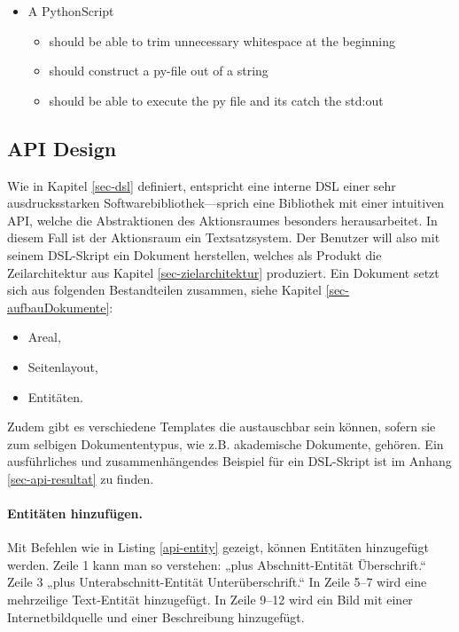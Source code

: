 \begin{itemize}
\item A PythonScript
\begin{itemize}
  \item should be able to trim unnecessary whitespace at the beginning
  \item should construct a py-file out of a string
  \item should be able to execute the py file and its catch the std:out
\end{itemize}
\end{itemize}

\subsection{API Design}\label{sec-api-design}

Wie in Kapitel \ref{sec-dsl} definiert, entspricht eine interne DSL einer sehr
ausdrucksstarken Softwarebibliothek---sprich eine Bibliothek
mit einer intuitiven API, welche die Abstraktionen
des Aktionsraumes besonders herausarbeitet.
In diesem Fall ist der Aktionsraum ein Textsatzsystem. Der Benutzer will
also mit seinem DSL-Skript ein Dokument herstellen, welches als Produkt die
Zeilarchitektur aus Kapitel \ref{sec-zielarchitektur} produziert.
Ein Dokument setzt sich aus folgenden Bestandteilen
zusammen, siehe Kapitel \ref{sec-aufbauDokumente}:

\begin{itemize}
  \item Areal,
  \item Seitenlayout,
  \item Entitäten.
\end{itemize}

Zudem gibt es verschiedene Templates die austauschbar sein können, sofern
sie zum selbigen Dokumententypus, wie z.B. akademische Dokumente, gehören.
Ein ausführliches und zusammenhängendes Beispiel für ein DSL-Skript
ist im Anhang \ref{sec-api-resultat} zu finden.

\paragraph{Entitäten hinzufügen.} Mit Befehlen wie in Listing
\ref{api-entity} gezeigt, können Entitäten hinzugefügt werden.
Zeile 1 kann man so verstehen: „plus Abschnitt-Entität Überschrift.“
Zeile 3 „plus Unterabschnitt-Entität Unterüberschrift.“
In Zeile 5--7 wird eine mehrzeilige Text-Entität hinzugefügt.
In Zeile 9--12 wird ein Bild mit einer Internetbildquelle und einer
Beschreibung hinzugefügt.


